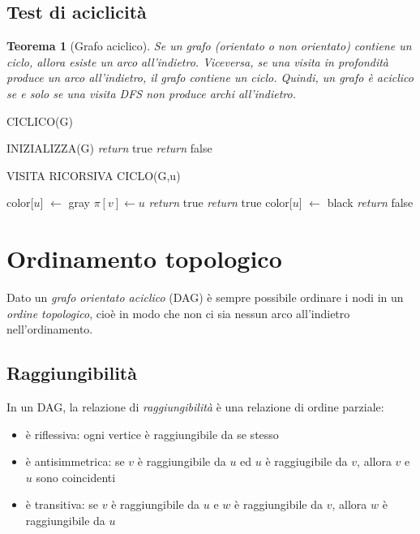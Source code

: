\documentclass[11pt]{book}
\newtheorem*{theorem}{Teorema}
\begin{document}
\section{Test di aciclicità}
\begin{theorem}[Grafo aciclico]
    Se un grafo (orientato o non orientato) contiene un ciclo, allora esiste un arco all'indietro. Viceversa, se una visita 
    in profondità produce un arco all'indietro, il grafo contiene un ciclo. Quindi, un grafo è aciclico se e solo se una 
    visita DFS non produce archi all'indietro.
\end{theorem} 
\begin{algorithm}[H]
    \caption{CICLICO(G)}
    \begin{algorithmic}
        \State INIZIALIZZA(G)
                \State \textit{return} true
            \EndIf 
        \EndFor
        \State \textit{return} false
    \end{algorithmic}
\end{algorithm}
\begin{algorithm}[H]
    \caption{VISITA RICORSIVA CICLO(G,u)}
    \begin{algorithmic}
        \State color[$u$] $\gets$ gray
                \State $\pi[v] \gets u$
                    \State \textit{return} true
                \EndIf
                    \State \textit{return} true
            \EndIf 
        \EndFor 
        \State color[$u$] $\gets$ black 
        \State \textit{return} false
    \end{algorithmic}
\end{algorithm}
\chapter{Ordinamento topologico}
Dato un \textit{grafo orientato aciclico} (DAG) è sempre possibile ordinare i nodi in un \textit{ordine topologico}, cioè 
in modo che non ci sia nessun arco all'indietro nell'ordinamento.
\section{Raggiungibilità}
In un DAG, la relazione di \textit{raggiungibilità} è una relazione di ordine parziale:
\begin{itemize}
    \item è riflessiva: ogni vertice è raggiungibile da se stesso 
    \item è antisimmetrica: se $v$ è raggiungibile da $u$ ed $u$ è raggiugibile da $v$, allora $v$ e $u$ sono coincidenti
    \item è transitiva: se $v$ è raggiungibile da $u$ e $w$ è raggiungibile da $v$, allora $w$ è raggiungibile da $u$
\end{itemize}
\end{document}
